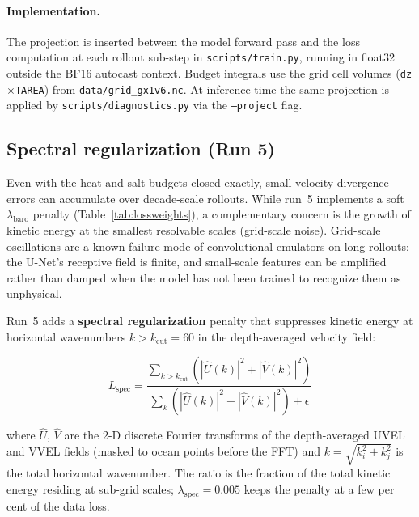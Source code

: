 \documentclass[11pt]{article}
\begin{document}
\paragraph{Implementation.}
The projection is inserted between the model forward pass and the loss
computation at each rollout sub-step in \texttt{scripts/train.py}, running
in float32 outside the BF16 autocast context. Budget integrals use the grid
cell volumes (\texttt{dz}$\times$\texttt{TAREA}) from \texttt{data/grid\_gx1v6.nc}.
At inference time the same projection is applied by
\texttt{scripts/diagnostics.py} via the \texttt{--project} flag.

\subsection{Spectral regularization (Run 5)}
\label{sec:spectral}

Even with the heat and salt budgets closed exactly, small velocity divergence
errors can accumulate over decade-scale rollouts. While run~5 implements a soft
$\lambda_\text{baro}$ penalty (Table~\ref{tab:lossweights}), a complementary
concern is the growth of kinetic energy at the smallest resolvable scales
(grid-scale noise). Grid-scale oscillations are a known failure mode of
convolutional emulators on long rollouts: the U-Net's receptive field is finite,
and small-scale features can be amplified rather than damped when the model has
not been trained to recognize them as unphysical.

Run~5 adds a \textbf{spectral regularization} penalty that suppresses kinetic
energy at horizontal wavenumbers $k > k_\text{cut} = 60$ in the
depth-averaged velocity field:

\begin{equation}
L_\text{spec}
= \frac{\displaystyle\sum_{k>k_\text{cut}}
        \left(\left|\hat{U}(k)\right|^2 + \left|\hat{V}(k)\right|^2\right)}
       {\displaystyle\sum_{k}
        \left(\left|\hat{U}(k)\right|^2 + \left|\hat{V}(k)\right|^2\right) + \epsilon}
\label{eq:spectral}
\end{equation}

where $\hat{U}$, $\hat{V}$ are the 2-D discrete Fourier transforms of the
depth-averaged UVEL and VVEL fields (masked to ocean points before the FFT)
and $k = \sqrt{k_i^2 + k_j^2}$ is the total horizontal wavenumber.
The ratio is the fraction of the total kinetic energy residing at
sub-grid scales; $\lambda_\text{spec} = 0.005$ keeps the penalty at a few
per cent of the data loss.
\end{document}
